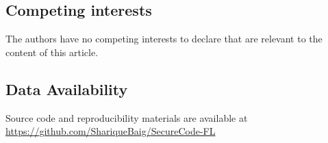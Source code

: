 \documentclass[pdflatex,sn-mathphys-num]{sn-jnl}
\theoremstyle{thmstyleone}%
\theoremstyle{thmstyletwo}%
\theoremstyle{thmstylethree}%
\begin{document}
\subsection{Competing interests}
The authors have no competing interests to declare that are relevant to the content of this article.

\subsection{Data Availability}
Source code and reproducibility materials are available at \url{https://github.com/ShariqueBaig/SecureCode-FL}

% 
\end{document}
